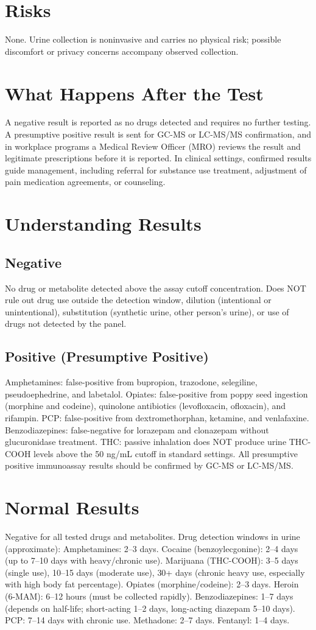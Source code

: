 \section*{Risks}
None. Urine collection is noninvasive and carries no physical risk; possible discomfort or privacy concerns accompany observed collection.
\section*{What Happens After the Test}
A negative result is reported as no drugs detected and requires no further testing. A presumptive positive result is sent for GC-MS or LC-MS/MS confirmation, and in workplace programs a Medical Review Officer (MRO) reviews the result and legitimate prescriptions before it is reported. In clinical settings, confirmed results guide management, including referral for substance use treatment, adjustment of pain medication agreements, or counseling.
\section*{Understanding Results}
\subsection*{Negative}
No drug or metabolite detected above the assay cutoff concentration. Does NOT rule out drug use outside the detection window, dilution (intentional or unintentional), substitution (synthetic urine, other person's urine), or use of drugs not detected by the panel.
\subsection*{Positive (Presumptive Positive)}
Amphetamines: false-positive from bupropion, trazodone, selegiline, pseudoephedrine, and labetalol. Opiates: false-positive from poppy seed ingestion (morphine and codeine), quinolone antibiotics (levofloxacin, ofloxacin), and rifampin. PCP: false-positive from dextromethorphan, ketamine, and venlafaxine. Benzodiazepines: false-negative for lorazepam and clonazepam without glucuronidase treatment. THC: passive inhalation does NOT produce urine THC-COOH levels above the 50 ng/mL cutoff in standard settings. All presumptive positive immunoassay results should be confirmed by GC-MS or LC-MS/MS.
\section*{Normal Results}
Negative for all tested drugs and metabolites. Drug detection windows in urine (approximate): Amphetamines: 2--3 days. Cocaine (benzoylecgonine): 2--4 days (up to 7--10 days with heavy/chronic use). Marijuana (THC-COOH): 3--5 days (single use), 10--15 days (moderate use), 30+ days (chronic heavy use, especially with high body fat percentage). Opiates (morphine/codeine): 2--3 days. Heroin (6-MAM): 6--12 hours (must be collected rapidly). Benzodiazepines: 1--7 days (depends on half-life; short-acting 1--2 days, long-acting diazepam 5--10 days). PCP: 7--14 days with chronic use. Methadone: 2--7 days. Fentanyl: 1--4 days.
